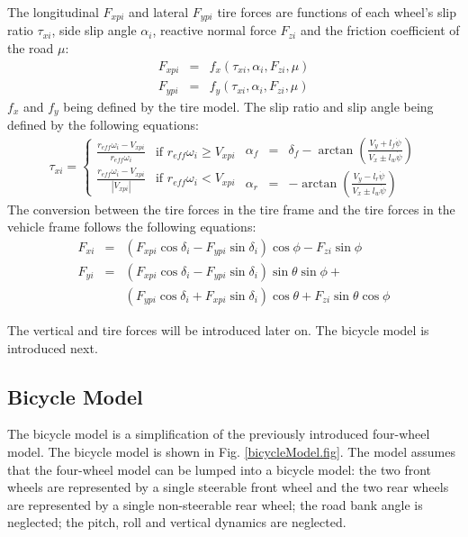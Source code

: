 \documentclass[journal]{IEEEtran}
\begin{document}
The longitudinal $F_{xpi}$ and lateral $F_{ypi}$ tire forces are functions of each wheel's slip ratio $\tau_{xi}$, side slip angle $\alpha_i$, reactive normal force $F_{zi}$ and the friction coefficient of the road $\mu$:
\begin{subequations}
\begin{eqnarray}
F_{xpi} &=& f_x(\tau_{xi}, \alpha_i, F_{zi}, \mu)\\
F_{ypi} &=& f_y(\tau_{xi}, \alpha_i, F_{zi}, \mu)
\end{eqnarray}
\end{subequations}
$f_x$ and $f_y$ being defined by the tire model. The slip ratio and slip angle being defined by the following equations:
\begin{subequations}
\begin{equation}\label{slip.eq}
\tau_{xi} = \begin{cases} \frac{r_{eff}\omega_i-V_{xpi}}{r_{eff}\omega_i} & \text{if $r_{eff}\omega_i \geq V_{xpi}$} \\
\frac{r_{eff}\omega_i-V_{xpi}}{|V_{xpi}|} & \text{if $r_{eff}\omega_i<V_{xpi}$} 
\end{cases}
\end{equation}
\begin{eqnarray}
\alpha_f &=& \delta_f-\arctan \left(\frac{V_y+l_f\dot\psi}{V_x\pm l_w\dot\psi}\right) \\
\alpha_r &=& -\arctan \left(\frac{V_y-l_r\dot\psi}{V_x\pm l_w\dot\psi}\right) 
\end{eqnarray}
\end{subequations}
The conversion between the tire forces in the tire frame and the tire forces in the vehicle frame follows the following equations: 
\begin{subequations}\label{tirebodylink.eq}
\begin{eqnarray}
F_{xi} &=& (F_{xpi}\cos\delta_i-F_{ypi}\sin\delta_i)\cos\phi-F_{zi}\sin\phi \\
F_{yi} &=& (F_{xpi}\cos\delta_i-F_{ypi}\sin\delta_i)\sin\theta\sin\phi+ \\
&& (F_{ypi}\cos\delta_i+F_{xpi}\sin\delta_i)\cos\theta+F_{zi}\sin\theta\cos\phi \nonumber
\end{eqnarray}
\end{subequations}

The vertical and tire forces will be introduced later on. The bicycle model is introduced next. 


\subsection{Bicycle Model}
The bicycle model is a simplification of the previously introduced four-wheel model. The bicycle model is shown in Fig. \ref{bicycleModel.fig}. The model assumes that the  four-wheel model can be lumped into a bicycle model: the two front wheels are represented by a single steerable front wheel and the two rear wheels are represented by a single non-steerable rear wheel; the road bank angle is neglected; the pitch, roll and vertical dynamics are neglected.
\end{document}
